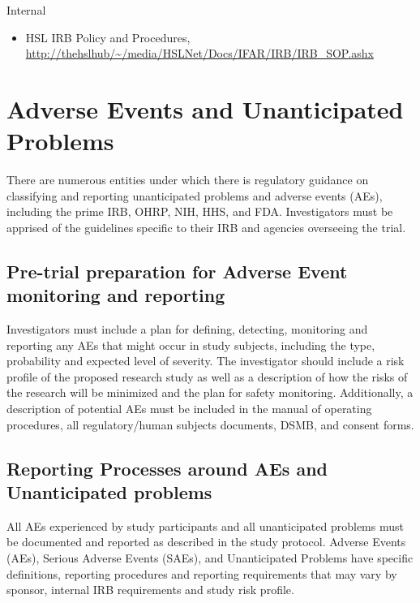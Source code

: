 \documentclass[]{book}
\providecommand{\tightlist}{%
  \setlength{\itemsep}{0pt}\setlength{\parskip}{0pt}}
\theoremstyle{definition}
\theoremstyle{definition}
\theoremstyle{definition}
\theoremstyle{remark}
\begin{document}
Internal

\begin{itemize}
\tightlist
\item
  HSL IRB Policy and Procedures,
  \url{http://thehslhub/~/media/HSLNet/Docs/IFAR/IRB/IRB_SOP.ashx}
\end{itemize}

\section{Adverse Events and Unanticipated
Problems}\label{adverse-events-and-unanticipated-problems}

There are numerous entities under which there is regulatory guidance on
classifying and reporting unanticipated problems and adverse events
(AEs), including the prime IRB, OHRP, NIH, HHS, and FDA. Investigators
must be apprised of the guidelines specific to their IRB and agencies
overseeing the trial.

\subsection{Pre-trial preparation for Adverse Event monitoring and
reporting}\label{pre-trial-preparation-for-adverse-event-monitoring-and-reporting}

Investigators must include a plan for defining, detecting, monitoring
and reporting any AEs that might occur in study subjects, including the
type, probability and expected level of severity. The investigator
should include a risk profile of the proposed research study as well as
a description of how the risks of the research will be minimized and the
plan for safety monitoring. Additionally, a description of potential AEs
must be included in the manual of operating procedures, all
regulatory/human subjects documents, DSMB, and consent forms.

\subsection{Reporting Processes around AEs and Unanticipated
problems}\label{reporting-processes-around-aes-and-unanticipated-problems}

All AEs experienced by study participants and all unanticipated problems
must be documented and reported as described in the study protocol.
Adverse Events (AEs), Serious Adverse Events (SAEs), and Unanticipated
Problems have specific definitions, reporting procedures and reporting
requirements that may vary by sponsor, internal IRB requirements and
study risk profile.
\end{document}
